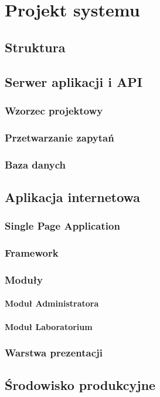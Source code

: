\chapter{Projekt systemu}
	\section{Struktura}
	\section{Serwer aplikacji i API}
		\subsection{Wzorzec projektowy}
		\subsection{Przetwarzanie zapytań}
		\subsection{Baza danych}
	\section{Aplikacja internetowa}
		\subsection{Single Page Application}
		\subsection{Framework}
		\subsection{Moduły}
			\subsubsection{Moduł Administratora}
			\subsubsection{Moduł Laboratorium}
		\subsection{Warstwa prezentacji}
	\section{Środowisko produkcyjne}
